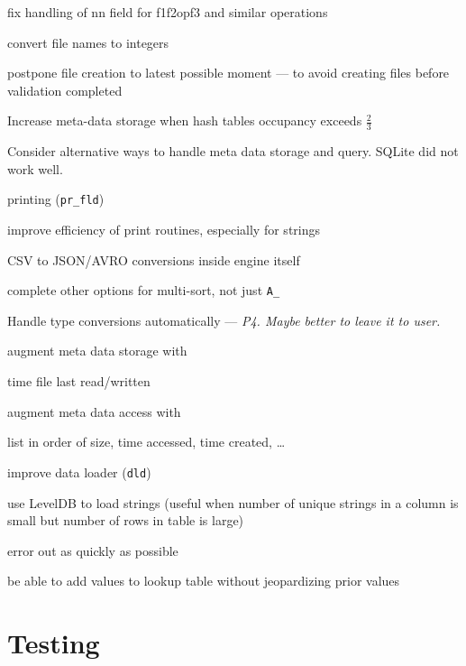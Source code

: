 \item fix handling of nn field for f1f2opf3 and similar operations
\item convert file names to integers
\item postpone file creation to latest possible moment --- to avoid
creating files before validation completed
\item Increase meta-data storage when hash tables occupancy exceeds
\(\frac{2}{3}\)
\item Consider alternative ways to handle meta data storage and query.
SQLite did not work well. 
\item printing (\verb+pr_fld+)
  \be
\item improve efficiency of print routines, especially for strings
\item CSV to JSON/AVRO conversions inside engine itself
\ee
\item complete other options for multi-sort, not just \verb+A_+
\item Handle type conversions automatically --- {\em P4. Maybe better to leave it to user.}
\item augment meta data storage with
\be
\item time file last read/written
\item 
\ee 
\item augment meta data access with 
\be
\item list in order of size, time accessed, time created, \ldots
\item 
\ee
\item improve data loader (\verb+dld+)
\be
\item use LevelDB to load strings (useful when number of unique strings
    in a column is small but number of rows in table is large)
\item error out as quickly as possible
\item be able to add values to lookup table without jeopardizing prior
values
\ee
\ee

\section{Testing}
\label{Testing}

